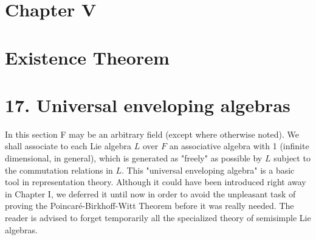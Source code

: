 \documentclass[10pt]{article}
\begin{document}
\section*{Chapter V}
\section*{Existence Theorem}
\section*{17. Universal enveloping algebras}
In this section F may be an arbitrary field (except where otherwise noted). We shall associate to each Lie algebra $L$ over $F$ an associative algebra with 1 (infinite dimensional, in general), which is generated as "freely" as possible by $L$ subject to the commutation relations in $L$. This "universal enveloping algebra" is a basic tool in representation theory. Although it could have been introduced right away in Chapter I, we deferred it until now in order to avoid the unpleasant task of proving the Poincaré-Birkhoff-Witt Theorem before it was really needed. The reader is advised to forget temporarily all the specialized theory of semisimple Lie algebras.
\end{document}
